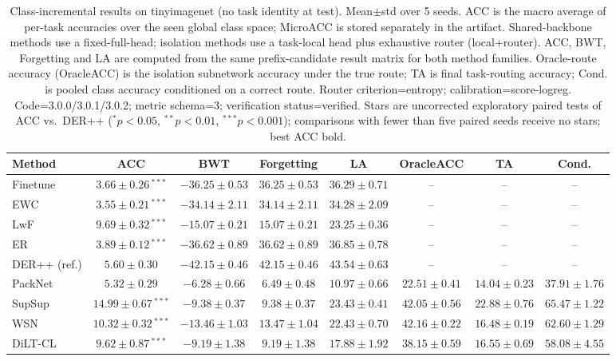 \begin{table}[t]
\centering
\caption{Class-incremental results on tinyimagenet (no task identity at test). Mean$\pm$std over 5 seeds. ACC is the macro average of per-task accuracies over the seen global class space; MicroACC is stored separately in the artifact. Shared-backbone methods use a fixed-full-head; isolation methods use a task-local head plus exhaustive router (local+router). ACC, BWT, Forgetting and LA are computed from the same prefix-candidate result matrix for both method families. Oracle-route accuracy (OracleACC) is the isolation subnetwork accuracy under the true route; TA is final task-routing accuracy; Cond. is pooled class accuracy conditioned on a correct route. Router criterion=entropy; calibration=score-logreg. Code=3.0.0/3.0.1/3.0.2; metric schema=3; verification status=verified. Stars are uncorrected exploratory paired tests of ACC vs.\ DER++ ($^{*}p<0.05$, $^{**}p<0.01$, $^{***}p<0.001$); comparisons with fewer than five paired seeds receive no stars; best ACC bold.}
\label{tab:classil_tinyimagenet}
\begin{tabular}{lccccccc}
\toprule
Method & ACC & BWT & Forgetting & LA & OracleACC & TA & Cond. \\
\midrule
Finetune & $3.66\pm0.26$\,$^{***}$ & $-36.25\pm0.53$ & $36.25\pm0.53$ & $36.29\pm0.71$ & -- & -- & -- \\
EWC & $3.55\pm0.21$\,$^{***}$ & $-34.14\pm2.11$ & $34.14\pm2.11$ & $34.28\pm2.09$ & -- & -- & -- \\
LwF & $9.69\pm0.32$\,$^{***}$ & $-15.07\pm0.21$ & $15.07\pm0.21$ & $23.25\pm0.36$ & -- & -- & -- \\
ER & $3.89\pm0.12$\,$^{***}$ & $-36.62\pm0.89$ & $36.62\pm0.89$ & $36.85\pm0.78$ & -- & -- & -- \\
DER++ (ref.) & $5.60\pm0.30$ & $-42.15\pm0.46$ & $42.15\pm0.46$ & $43.54\pm0.63$ & -- & -- & -- \\
PackNet & $5.32\pm0.29$ & $-6.28\pm0.66$ & $6.49\pm0.48$ & $10.97\pm0.66$ & $22.51\pm0.41$ & $14.04\pm0.23$ & $37.91\pm1.76$ \\
SupSup & $\mathbf{14.99\pm0.67}$\,$^{***}$ & $-9.38\pm0.37$ & $9.38\pm0.37$ & $23.43\pm0.41$ & $42.05\pm0.56$ & $22.88\pm0.76$ & $65.47\pm1.22$ \\
WSN & $10.32\pm0.32$\,$^{***}$ & $-13.46\pm1.03$ & $13.47\pm1.04$ & $22.43\pm0.70$ & $42.16\pm0.22$ & $16.48\pm0.19$ & $62.60\pm1.29$ \\
DiLT-CL & $9.62\pm0.87$\,$^{***}$ & $-9.19\pm1.38$ & $9.19\pm1.38$ & $17.88\pm1.92$ & $38.15\pm0.59$ & $16.55\pm0.69$ & $58.08\pm4.55$ \\
\bottomrule
\end{tabular}
\end{table}

